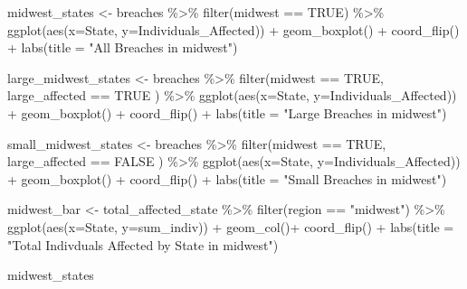 \documentclass[
]{article}
\newenvironment{Shaded}{\begin{snugshade}}{\end{snugshade}}
\newcommand{\AttributeTok}[1]{\textcolor[rgb]{0.77,0.63,0.00}{#1}}
\newcommand{\ConstantTok}[1]{\textcolor[rgb]{0.00,0.00,0.00}{#1}}
\newcommand{\FunctionTok}[1]{\textcolor[rgb]{0.00,0.00,0.00}{#1}}
\newcommand{\NormalTok}[1]{#1}
\newcommand{\OtherTok}[1]{\textcolor[rgb]{0.56,0.35,0.01}{#1}}
\newcommand{\SpecialCharTok}[1]{\textcolor[rgb]{0.00,0.00,0.00}{#1}}
\newcommand{\StringTok}[1]{\textcolor[rgb]{0.31,0.60,0.02}{#1}}
\begin{document}
\begin{Shaded}
\begin{Highlighting}[]
\NormalTok{midwest\_states }\OtherTok{\textless{}{-}}\NormalTok{ breaches }\SpecialCharTok{\%\textgreater{}\%}
  \FunctionTok{filter}\NormalTok{(midwest }\SpecialCharTok{==} \ConstantTok{TRUE}\NormalTok{) }\SpecialCharTok{\%\textgreater{}\%}
  \FunctionTok{ggplot}\NormalTok{(}\FunctionTok{aes}\NormalTok{(}\AttributeTok{x=}\NormalTok{State, }\AttributeTok{y=}\NormalTok{Individuals\_Affected)) }\SpecialCharTok{+}
  \FunctionTok{geom\_boxplot}\NormalTok{() }\SpecialCharTok{+} 
  \FunctionTok{coord\_flip}\NormalTok{() }\SpecialCharTok{+}
  \FunctionTok{labs}\NormalTok{(}\AttributeTok{title =} \StringTok{"All Breaches in midwest"}\NormalTok{)}

\NormalTok{large\_midwest\_states }\OtherTok{\textless{}{-}}\NormalTok{ breaches }\SpecialCharTok{\%\textgreater{}\%}
  \FunctionTok{filter}\NormalTok{(midwest }\SpecialCharTok{==} \ConstantTok{TRUE}\NormalTok{, large\_affected }\SpecialCharTok{==} \ConstantTok{TRUE}\NormalTok{ ) }\SpecialCharTok{\%\textgreater{}\%}
  \FunctionTok{ggplot}\NormalTok{(}\FunctionTok{aes}\NormalTok{(}\AttributeTok{x=}\NormalTok{State, }\AttributeTok{y=}\NormalTok{Individuals\_Affected)) }\SpecialCharTok{+}
  \FunctionTok{geom\_boxplot}\NormalTok{() }\SpecialCharTok{+} 
  \FunctionTok{coord\_flip}\NormalTok{() }\SpecialCharTok{+}
  \FunctionTok{labs}\NormalTok{(}\AttributeTok{title =} \StringTok{"Large Breaches in midwest"}\NormalTok{)}

\NormalTok{small\_midwest\_states }\OtherTok{\textless{}{-}}\NormalTok{ breaches }\SpecialCharTok{\%\textgreater{}\%}
  \FunctionTok{filter}\NormalTok{(midwest }\SpecialCharTok{==} \ConstantTok{TRUE}\NormalTok{, large\_affected }\SpecialCharTok{==} \ConstantTok{FALSE}\NormalTok{ ) }\SpecialCharTok{\%\textgreater{}\%}
  \FunctionTok{ggplot}\NormalTok{(}\FunctionTok{aes}\NormalTok{(}\AttributeTok{x=}\NormalTok{State, }\AttributeTok{y=}\NormalTok{Individuals\_Affected)) }\SpecialCharTok{+}
  \FunctionTok{geom\_boxplot}\NormalTok{() }\SpecialCharTok{+} 
  \FunctionTok{coord\_flip}\NormalTok{() }\SpecialCharTok{+}
  \FunctionTok{labs}\NormalTok{(}\AttributeTok{title =} \StringTok{"Small Breaches in midwest"}\NormalTok{)}

\NormalTok{midwest\_bar }\OtherTok{\textless{}{-}}\NormalTok{ total\_affected\_state }\SpecialCharTok{\%\textgreater{}\%}
  \FunctionTok{filter}\NormalTok{(region }\SpecialCharTok{==} \StringTok{"midwest"}\NormalTok{) }\SpecialCharTok{\%\textgreater{}\%}
  \FunctionTok{ggplot}\NormalTok{(}\FunctionTok{aes}\NormalTok{(}\AttributeTok{x=}\NormalTok{State, }\AttributeTok{y=}\NormalTok{sum\_indiv)) }\SpecialCharTok{+}
  \FunctionTok{geom\_col}\NormalTok{()}\SpecialCharTok{+}
  \FunctionTok{coord\_flip}\NormalTok{() }\SpecialCharTok{+}
  \FunctionTok{labs}\NormalTok{(}\AttributeTok{title =} \StringTok{"Total Indivduals Affected by State in midwest"}\NormalTok{)}

\NormalTok{midwest\_states}
\end{Highlighting}
\end{Shaded}
\end{document}

